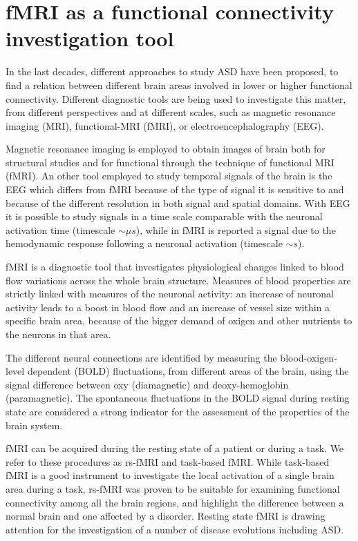 \documentclass[11pt]{report}
\begin{document}
\section{fMRI as a functional connectivity investigation tool}

In the last decades, different approaches to study ASD have been proposed, to find a relation between different brain areas involved in lower or higher functional connectivity.
Different diagnostic tools are being used to investigate this matter, from different perspectives and at different scales, such as magnetic resonance imaging (MRI), functional-MRI (fMRI), or electroencephalography (EEG).

Magnetic resonance imaging is employed to obtain images of brain both for structural studies and for functional through the  technique of functional MRI (fMRI).
An other tool employed to study temporal signals of the brain is the EEG which differs from fMRI because of the type of signal it is sensitive to and because of the different resolution in both signal and spatial domains. With EEG it is possible to study signals in a time scale comparable with the neuronal activation time (timescale $\sim \mu s$), while in fMRI is reported a signal due to the hemodynamic response following a neuronal activation (timescale $\sim s$).

fMRI is a diagnostic tool that investigates physiological changes linked to blood flow variations across the whole brain structure.
Measures of blood properties are strictly linked with measures of the neuronal activity: an increase of neuronal activity leads to a boost in blood flow and an increase of vessel size within a specific brain area, because of the bigger demand of oxigen and other nutrients to the neurons in that area.

The different neural connections are identified by measuring the blood-oxigen-level dependent (BOLD) fluctuations, from different areas of the brain, using the signal difference between oxy (diamagnetic) and deoxy-hemoglobin (paramagnetic).
The spontaneous fluctuations in the BOLD signal during resting state are considered a strong indicator for the assessment of the properties of the brain system.

fMRI can be acquired during the resting state of a patient or during a task.
We refer to these procedures as rs-fMRI and task-based fMRI. While task-based fMRI is a good instrument to investigate the local activation of a single brain area during a task, rs-fMRI was proven to be suitable for examining functional connectivity among all the brain regions, and highlight the difference between a normal brain and one affected by a disorder.
Resting state fMRI is drawing attention for the investigation of a number of disease evolutions including ASD.
\end{document}
